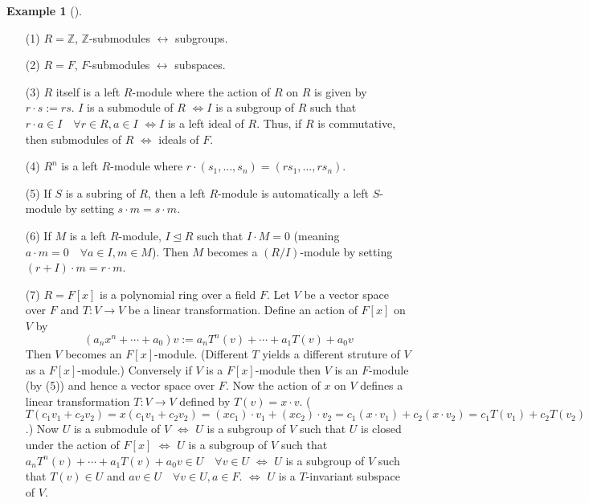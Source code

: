 \documentclass{article}
\theoremstyle{definition}
\newtheorem{ex}{Example}
\newenvironment{exs}[1][]{%
  \begin{ex}[#1]$ $\par\nobreak\ignorespaces
}{%
  \end{ex}
}
\newcommand{\ZZ}{\mathbb Z}
\newcommand{\Lra}{\Leftrightarrow}
\newcommand{\lra}{\leftrightarrow}
\newcommand{\normto}{\trianglelefteq}
\begin{document}
\begin{exs}
	\begin{enumerate}
		\item[(1)] $R = \ZZ$, $\ZZ$-submodules $\lra$ subgroups.

		\item[(2)] $R = F$, $F$-submodules $\lra$ subspaces.

		\item[(3)] $R$ itself is a left $R$-module where the action of $R$ on $R$ is given by $r \cdot s := rs$.
			$I$ is a submodule of $R$ $\Lra I$ is a subgroup of $R$ such that $r \cdot a \in I \quad \forall r \in R, a \in I$ $\Lra I$ is a left ideal of $R$.
			Thus, if $R$ is commutative, then submodules of $R$ $\Lra$ ideals of $F$.

		\item[(4)] $R^n$ is a left $R$-module where $r \cdot (s_1, ..., s_n) = (r s_1, ..., r s_n)$.

		\item[(5)] If $S$ is a subring of $R$, then a left $R$-module is automatically a left $S$-module by setting $s \cdot m = s \cdot m$.

		\item[(6)] If $M$ is a left $R$-module, $I \normto R$ such that $I \cdot M = 0$ (meaning $a \cdot m = 0 \quad \forall a \in I ,m \in M$).
			Then $M$ becomes a $(R/I)$-module by setting $(r + I) \cdot m = r \cdot m$.

		\item[(7)] $R = F[x]$ is a polynomial ring over a field $F$.
			Let $V$ be a vector space over $F$ and $T: V \to V$ be a linear transformation.
			Define an action of $F[x]$ on $V$ by
			\[
				(a_n x^n + \cdots + a_0) v := a_n T^n(v) + \cdots + a_1 T(v) + a_0 v
			\]
			Then $V$ becomes an $F[x]$-module.
			(Different $T$ yields a different struture of $V$ as a $F[x]$-module.)
			Conversely if $V$ is a $F[x]$-module then $V$ is an $F$-module (by (5)) and hence a vector space over $F$.
			Now the action of $x$ on $V$ defines a linear transformation $T: V \to V$ defined by $T(v) = x \cdot v$.
			($T(c_1 v_1 + c_2 v_2) = x (c_1 v_1 + c_2 v_2) = (x c_1) \cdot v_1 + (x c_2) \cdot v_2 = c_1 (x \cdot v_1) + c_2 (x \cdot v_2) = c_1 T(v_1) + c_2 T(v_2)$.)
			Now $U$ is a submodule of $V$ $\Lra$ $U$ is a subgroup of $V$ such that $U$ is closed under the action of $F[x]$ 
			$\Lra$ $U$ is a subgroup of $V$ such that $a_n T^n (v) + \cdots + a_1 T(v) + a_0 v \in U \quad \forall v \in U$ 
			$\Lra$ $U$ is a subgroup of $V$ such that $T(v) \in U$ and $av \in U \quad \forall v \in U, a \in F$.
			$\Lra$ $U$ is a $T$-invariant subspace of $V$.
	\end{enumerate}
\end{exs}
\end{document}
